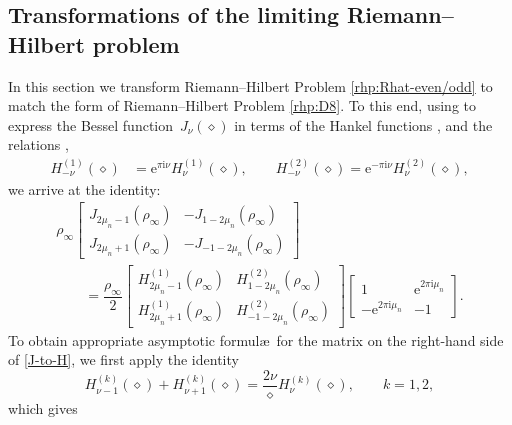 \documentclass[11pt]{article}
\numberwithin{equation}{section}
\numberwithin{equation}{section}
\newcommand{\ee}{\mathrm{e}}
\newcommand{\ii}{\mathrm{i}}
\begin{document}
\subsection{Transformations of the limiting Riemann--Hilbert problem} In this section we transform Riemann--Hilbert Problem \ref{rhp:Rhat-even/odd} to match the form of Riemann--Hilbert Problem \ref{rhp:D8}. To this end, using \cite[equations~(10.4.4) and (10.4.6)]{DLMF} to express the Bessel function~$J_\nu(\diamond)$ in terms of the Hankel functions ,  and the relations \cite[equation~(10.4.4) and~(10.4.6)]{DLMF},
\begin{align*}
 H_{-\nu}^{(1)}(\diamond) &= \ee^{\pi \ii \nu}H_{\nu}^{(1)}(\diamond) , \qquad
 H_{-\nu}^{(2)}(\diamond) = \ee^{-\pi \ii \nu}H_{\nu}^{(2)}(\diamond) ,
\end{align*}
we arrive at the identity:
\begin{gather}
 \rho_\infty \begin{bmatrix}J_{2\mu_n - 1}(\rho_\infty) & -J_{1- 2\mu_n}(\rho_\infty)\\
 J_{2\mu_n +1}(\rho_\infty) & -J_{-1-2\mu_n}(\rho_\infty)\end{bmatrix}\nonumber \\
 \qquad= \dfrac{\rho_\infty}{2} \begin{bmatrix}H_{2\mu_n - 1}^{(1)}(\rho_\infty) & H_{1 -2\mu_n}^{(2)}(\rho_\infty) \\ H^{(1)}_{2\mu_n + 1}(\rho_\infty) & H_{-1 -2\mu_n}^{(2)}(\rho_\infty) \end{bmatrix} \begin{bmatrix} 1 & \ee^{2\pi \ii \mu_n} \\ -\ee^{2\pi \ii \mu_n} & -1 \end{bmatrix}. \label{J-to-H}
\end{gather}
To obtain appropriate asymptotic formul\ae\ for the matrix on the right-hand side of \eqref{J-to-H}, we first apply the identity \cite[equation~(10.6.1)]{DLMF}
\begin{equation*}
 H^{(k)}_{\nu-1}(\diamond) + H^{(k)}_{\nu + 1}(\diamond) = \dfrac{2\nu}{\diamond} H^{(k)}_\nu(\diamond), \qquad k = 1, 2,
\end{equation*}
which gives
\end{document}
